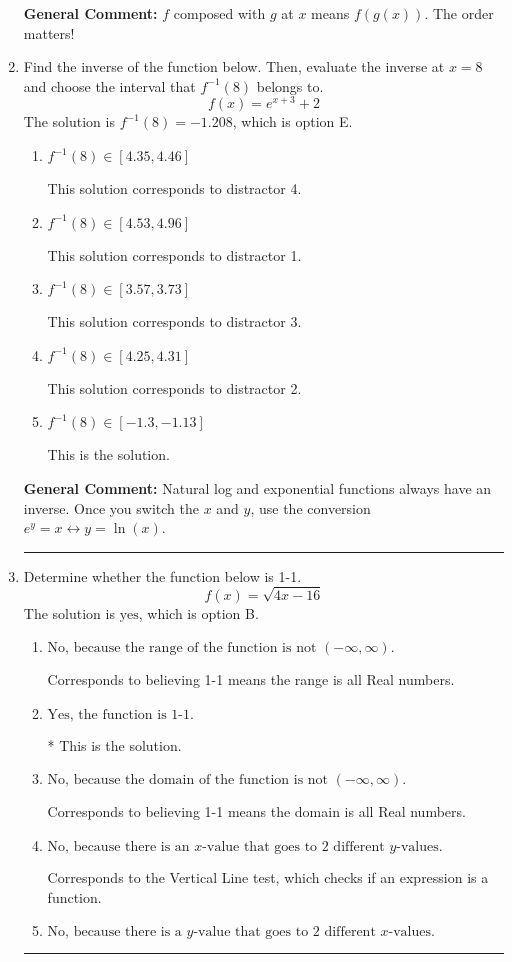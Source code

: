 \documentclass{extbook}[14pt]
\newcommand{\litem}[1]{\item #1

\rule{\textwidth}{0.4pt}}
\begin{document}
\begin{enumerate}
{\begin{enumerate}[label=\Alph*.]
\end{enumerate}

\textbf{General Comment:} $f$ composed with $g$ at $x$ means $f(g(x))$. The order matters!
}
\litem{
Find the inverse of the function below. Then, evaluate the inverse at $x = 8$ and choose the interval that $f^{-1}(8)$ belongs to.
\[ f(x) = e^{x+3}+2 \]The solution is \( f^{-1}(8) = -1.208 \), which is option E.\begin{enumerate}[label=\Alph*.]
\item \( f^{-1}(8) \in [4.35, 4.46] \)

 This solution corresponds to distractor 4.
\item \( f^{-1}(8) \in [4.53, 4.96] \)

 This solution corresponds to distractor 1.
\item \( f^{-1}(8) \in [3.57, 3.73] \)

 This solution corresponds to distractor 3.
\item \( f^{-1}(8) \in [4.25, 4.31] \)

 This solution corresponds to distractor 2.
\item \( f^{-1}(8) \in [-1.3, -1.13] \)

 This is the solution.
\end{enumerate}

\textbf{General Comment:} Natural log and exponential functions always have an inverse. Once you switch the $x$ and $y$, use the conversion $ e^y = x \leftrightarrow y=\ln(x)$.
}
\litem{
Determine whether the function below is 1-1.
\[ f(x) = \sqrt{4 x - 16} \]The solution is \( \text{yes} \), which is option B.\begin{enumerate}[label=\Alph*.]
\item \( \text{No, because the range of the function is not $(-\infty, \infty)$.} \)

Corresponds to believing 1-1 means the range is all Real numbers.
\item \( \text{Yes, the function is 1-1.} \)

* This is the solution.
\item \( \text{No, because the domain of the function is not $(-\infty, \infty)$.} \)

Corresponds to believing 1-1 means the domain is all Real numbers.
\item \( \text{No, because there is an $x$-value that goes to 2 different $y$-values.} \)

Corresponds to the Vertical Line test, which checks if an expression is a function.
\item \( \text{No, because there is a $y$-value that goes to 2 different $x$-values.} \)


\end{enumerate}}
\end{enumerate}
\end{document}
